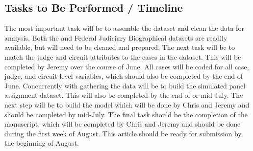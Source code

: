 \documentclass[12pt]{article}
\begin{document}
\subsection*{Tasks to Be Performed / Timeline}
The most important task will be to assemble the dataset and clean the data for analysis.  Both the \citeauthor*{Songer2007} and Federal Judiciary Biographical datasets are readily available, but will need to be cleaned and prepared.  The next task will be to match the judge and circuit attributes to the cases in the \citeauthor{Songer2007} dataset.  This will be completed by Jeremy over the course of June.  All cases will be coded for all case, judge, and circuit level variables, which should also be completed by the end of June.  Concurrently with gathering the data will be to build the simulated panel assignment dataset.  This will also be completed by the end of or mid-July.  The next step will be to build the model which will be done by Chris and Jeremy and should be completed by mid-July.  The final task should be the completion of the manuscript, which will be completed by Chris and Jeremy and should be done during the first week of August.  This article should be ready for submission by the beginning of August.

\singlespacing
\scriptsize


\end{document}
